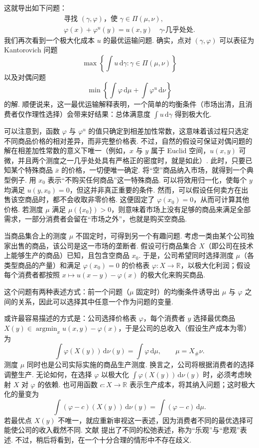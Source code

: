 \label{idx:i53-p46}
这就导出如下问题：
\begin{equation*}
\begin{gathered}
 \text{寻找 }(\gamma,\varphi)\text{，使 }\gamma\in\Pi(\mu,\nu),\\
 \varphi(x)+\varphi^u(y)=u(x,y)\quad\gamma\text{-几乎处处}.
\end{gathered}
\end{equation*}
我们再次看到一个极大化成本 $u$ 的最优运输问题. 确实，点对 $(\gamma,\varphi)$ 可以表征为 Kantorovich 问题
\[
 \max\left\{\int u\,\mathrm d\gamma:\gamma\in\Pi(\mu,\nu)\right\}
\]
以及对偶问题
\[
 \min\left\{\int\varphi\,\mathrm d\mu+\int\varphi^u\,\mathrm d\nu\right\}
\]
的解. 顺便说来，这一最优运输解释表明，一个简单的均衡条件（市场出清，且消费者仅作理性选择）会带来好结果：总体满意度 $\int u\,\mathrm d\gamma$ 得到极大化.

可以注意到，函数 $\varphi$ 与 $\varphi^u$ 的值只确定到相差加性常数，这意味着该过程只选定不同商品价格的相对差异，而非完整价格表. 不过，自然的假设可保证对偶问题的解在相差加性常数的意义下唯一（例如，$x$ 与 $y$ 属于 Euclid 空间，$u(x,y)$ 可微，并且两个测度之一几乎处处具有严格正的密度时，就是如此）. 此时，只要已知某个特殊商品 $\bar x$ 的价格，一切便唯一确定. 将“空”商品纳入市场，就得到一个典型例子. 用 $x_0$ 表示“不购买任何商品”这一特殊商品. 可以将效用归一化，使每个 $y$ 均满足 $u(y,x_0)=0$，但这并非真正重要的条件. 然而，可以假设任何卖方在出售该空商品时，都不会收取非零价格. 这便固定了 $\varphi(x_0)=0$，从而可计算其他价格. 若测度 $\mu$ 满足 $\mu(\{x_0\})>0$，则意味着市场上没有足够的商品来满足全部需求，一部分消费者会留在“市场之外”，也就是购买空商品.

当商品集合上的测度 $\mu$ 不固定时，可得到另一个有趣问题. 考虑一类由某个公司独家出售的商品，该公司是这一市场的垄断者. 假设可行商品集合 $X$（即公司在技术上能够生产的商品）已知，且包含空商品 $x_0$. 于是，公司希望同时选择测度 $\mu$（各类型商品的产量）和满足 $\varphi(x_0)=0$ 的价格表 $\varphi:X\to\mathbb R$，以极大化利润；假设每个消费者都按照 $x\mapsto u(x-y)-\varphi(x)$ 的极大化来购买商品.

这个问题有两种表述方式：前一个问题（$\mu$ 固定时）的均衡条件诱导出 $\mu$ 与 $\varphi$ 之间的关系，因此可以选择其中任意一个作为问题的变量.

或许最容易描述的方式是：公司选择价格表 $\varphi$，每个消费者 $y$ 选择最优商品 $X(y)\in\operatorname*{argmin}_x u(x,y)-\varphi(x)$，于是公司的总收入（假设生产成本为零）为
\[
 \int\varphi(X(y))\,\mathrm d\nu(y)=\int\varphi\,\mathrm d\mu,
 \qquad\mu=X_\#\nu.
\]
测度 $\mu$ 同时也是公司实际实施的商品生产测度. 换言之，公司将根据消费者的选择调整生产. 无论如何，在选择 $\varphi$ 以极大化 $\int\varphi(X(y))\,\mathrm d\nu(y)$ 时，必须考虑映射 $X$ 对 $\varphi$ 的依赖. 也可用函数 $c:X\to\mathbb R$ 表示生产成本，将其纳入问题；这时极大化的量变为
\[
 \int(\varphi-c)(X(y))\,\mathrm d\nu(y)=\int(\varphi-c)\,\mathrm d\mu.
\]
若最优点 $X(y)$ 不唯一，就应重新审视这一表述，因为消费者不同的最优选择可能使公司的收入截然不同. 文献\cite{b178} 提出了不同的松弛表述，称为“乐观”与“悲观”表述. 不过，稍后将看到，在一个十分合理的情形中不存在歧义.

